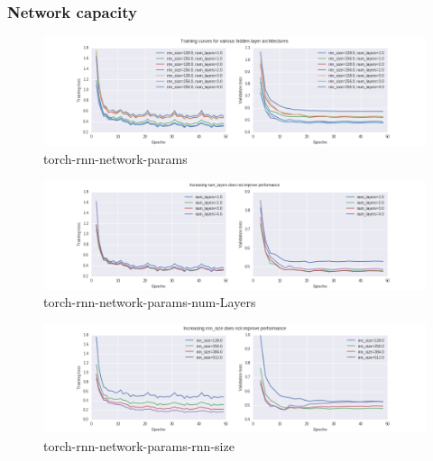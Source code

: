 
\subsubsection{Network capacity}

\begin{figure}[htpb]
    \centering
    \includegraphics[width=\linewidth]{torch-rnn-network-params.png}
    \caption{torch-rnn-network-params}
    \label{fig:torch-rnn-network-params}
\end{figure}

\begin{figure}[htpb]
  \centering
  \includegraphics[width=1.0\linewidth]{torch-rnn-network-params-num-layers.png}
  \caption{torch-rnn-network-params-num-Layers}
  \label{fig:torch-rnn-network-params-num-layers}
\end{figure}

\begin{figure}[htpb]
  \centering
  \includegraphics[width=1.0\linewidth]{torch-rnn-network-params-rnn-size.png}
  \caption{torch-rnn-network-params-rnn-size}
  \label{fig:torch-rnn-network-params-rnn-size}
\end{figure}

